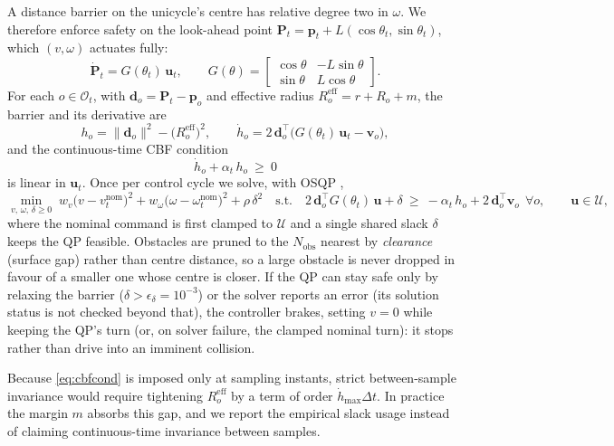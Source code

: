 A distance barrier on the unicycle's centre has relative degree two in $\omega$. We therefore enforce safety on the look-ahead point $\mathbf{P}_t=\mathbf{p}_t+L(\cos\theta_t,\sin\theta_t)$, which $(v,\omega)$ actuates fully:
\begin{equation}\label{eq:lookahead}
\dot{\mathbf{P}}_t=G(\theta_t)\,\mathbf{u}_t,\qquad
G(\theta)=\begin{bmatrix}\cos\theta & -L\sin\theta\\ \sin\theta & L\cos\theta\end{bmatrix}.
\end{equation}
For each $o\in\mathcal{O}_t$, with $\mathbf{d}_o=\mathbf{P}_t-\mathbf{p}_o$ and effective radius $R^{\mathrm{eff}}_o=r+R_o+m$, the barrier and its derivative are
\begin{equation}\label{eq:barrier}
h_o=\|\mathbf{d}_o\|^2-\big(R^{\mathrm{eff}}_o\big)^2,\qquad
\dot h_o=2\,\mathbf{d}_o^{\top}\big(G(\theta_t)\,\mathbf{u}_t-\mathbf{v}_o\big),
\end{equation}
and the continuous-time CBF condition \citep{ames_cbf_tac,ames_cbf_ecc}
\begin{equation}\label{eq:cbfcond}
\dot h_o+\alpha_t\,h_o\ \ge\ 0
\end{equation}
is linear in $\mathbf{u}_t$. Once per control cycle we solve, with OSQP \citep{osqp},
\begin{equation}\label{eq:qp}
\min_{v,\,\omega,\,\delta\ge0}\;w_v\big(v-v^{\mathrm{nom}}_t\big)^2+w_\omega\big(\omega-\omega^{\mathrm{nom}}_t\big)^2+\rho\,\delta^2
\quad\text{s.t.}\quad
2\,\mathbf{d}_o^{\top}G(\theta_t)\,\mathbf{u}+\delta\ \ge\ -\alpha_t\,h_o+2\,\mathbf{d}_o^{\top}\mathbf{v}_o\ \ \forall o,\qquad \mathbf{u}\in\mathcal{U},
\end{equation}
where the nominal command is first clamped to $\mathcal{U}$ and a single shared slack $\delta$ keeps the QP feasible. Obstacles are pruned to the $N_{\mathrm{obs}}$ nearest by \emph{clearance} (surface gap) rather than centre distance, so a large obstacle is never dropped in favour of a smaller one whose centre is closer. If the QP can stay safe only by relaxing the barrier ($\delta>\epsilon_\delta=10^{-3}$) or the solver reports an error (its solution status is not checked beyond that), the controller brakes, setting $v=0$ while keeping the QP's turn (or, on solver failure, the clamped nominal turn): it stops rather than drive into an imminent collision.

Because \eqref{eq:cbfcond} is imposed only at sampling instants, strict between-sample invariance would require tightening $R^{\mathrm{eff}}_o$ by a term of order $\dot h_{\max}\Delta t$. In practice the margin $m$ absorbs this gap, and we report the empirical slack usage instead of claiming continuous-time invariance between samples.

